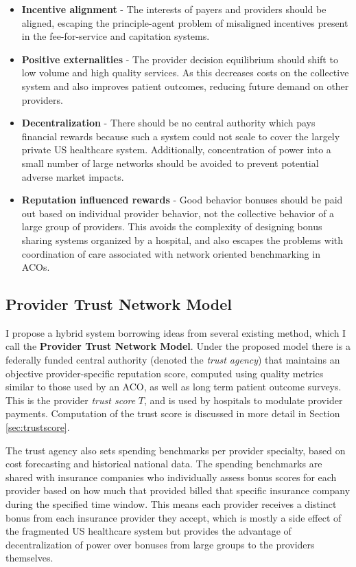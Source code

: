\documentclass{article}
\begin{document}
\begin{itemize}
    \item \textbf{Incentive alignment} - The interests of payers and providers should be aligned, escaping the principle-agent problem of misaligned incentives present in the fee-for-service and capitation systems.
    \item \textbf{Positive externalities} - The provider decision equilibrium should shift to low volume and high quality services. As this decreases costs on the collective system and also improves patient outcomes, reducing future demand on other providers.
    \item \textbf{Decentralization} - There should be no central authority which pays financial rewards because such a system could not scale to cover the largely private US healthcare system. Additionally, concentration of power into a small number of large networks should be avoided to prevent potential adverse market impacts.
    \item \textbf{Reputation influenced rewards} - Good behavior bonuses should be paid out based on individual provider behavior, not the collective behavior of a large group of providers. This avoids the complexity of designing bonus sharing systems organized by a hospital, and also escapes the problems with coordination of care associated with network oriented benchmarking in ACOs.
\end{itemize}

\subsection{Provider Trust Network Model}
I propose a hybrid system borrowing ideas from several existing method, which I call the \textbf{Provider Trust Network Model}. Under the proposed model there is a federally funded central authority (denoted the \emph{trust agency}) that maintains an objective provider-specific reputation score, computed using quality metrics similar to those used by an ACO, as well as long term patient outcome surveys. This is the provider \emph{trust score} $T$, and is used by hospitals to modulate provider payments. Computation of the trust score is discussed in more detail in Section \ref{sec:trustscore}.

The trust agency also sets spending benchmarks per provider specialty, based on cost forecasting and historical national data. The spending benchmarks are shared with insurance companies who individually assess bonus scores for each provider based on how much that provided billed that specific insurance company during the specified time window. This means each provider receives a distinct bonus from each insurance provider they accept, which is mostly a side effect of the fragmented US healthcare system but provides the advantage of decentralization of power over bonuses from large groups to the providers themselves.
\end{document}
